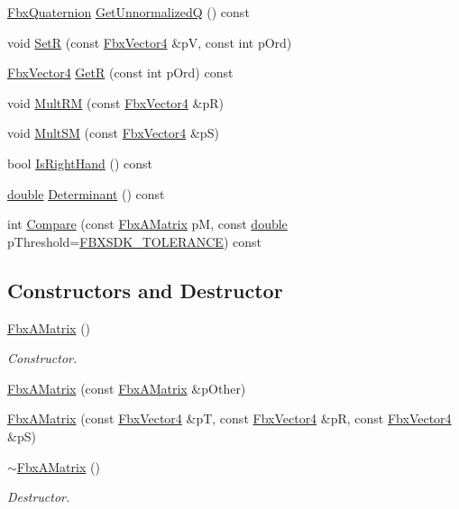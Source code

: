 \begin{DoxyCompactItemize}
\item 
\hyperlink{class_fbx_quaternion}{Fbx\+Quaternion} \hyperlink{class_fbx_a_matrix_aa6c9cff20dd3d26d5df852705a0ee149}{Get\+UnnormalizedQ} () const
\item 
void \hyperlink{class_fbx_a_matrix_a54374d0885fa0cf9ab2e619871cb000d}{SetR} (const \hyperlink{class_fbx_vector4}{Fbx\+Vector4} \&pV, const int p\+Ord)
\item 
\hyperlink{class_fbx_vector4}{Fbx\+Vector4} \hyperlink{class_fbx_a_matrix_ae36e44525e67b5a7076b9e2be733f456}{GetR} (const int p\+Ord) const
\item 
void \hyperlink{class_fbx_a_matrix_a74b163f39e346d5dedfd4d56f9624353}{Mult\+RM} (const \hyperlink{class_fbx_vector4}{Fbx\+Vector4} \&pR)
\item 
void \hyperlink{class_fbx_a_matrix_a96ecf0c5a8772ebdcc7f13b54651b3ed}{Mult\+SM} (const \hyperlink{class_fbx_vector4}{Fbx\+Vector4} \&pS)
\item 
bool \hyperlink{class_fbx_a_matrix_a9cdf7165572983d917a8e59577c3a55a}{Is\+Right\+Hand} () const
\item 
\hyperlink{class_fbx_a_matrix_ad463edbb9fea344643297701f159faa7}{double} \hyperlink{class_fbx_a_matrix_a4aa7cbe3d389f1d2cbdfbbf2de032192}{Determinant} () const
\item 
int \hyperlink{class_fbx_a_matrix_a9ffb29a163216aa93b36c29e143f08f8}{Compare} (const \hyperlink{class_fbx_a_matrix}{Fbx\+A\+Matrix} pM, const \hyperlink{class_fbx_a_matrix_ad463edbb9fea344643297701f159faa7}{double} p\+Threshold=\hyperlink{fbxtypes_8h_acf3cd6f208edb42ad9c9abbc1f7feea0}{F\+B\+X\+S\+D\+K\+\_\+\+T\+O\+L\+E\+R\+A\+N\+CE}) const
\end{DoxyCompactItemize}
\subsection*{Constructors and Destructor}
\begin{DoxyCompactItemize}
\item 
\hyperlink{class_fbx_a_matrix_afde94bf7fa3e5a001cf8c0733aab69ea}{Fbx\+A\+Matrix} ()
\begin{DoxyCompactList}\small\item\em Constructor. \end{DoxyCompactList}\item 
\hyperlink{class_fbx_a_matrix_a610a8cdf2f914285630decbf576d77ab}{Fbx\+A\+Matrix} (const \hyperlink{class_fbx_a_matrix}{Fbx\+A\+Matrix} \&p\+Other)
\item 
\hyperlink{class_fbx_a_matrix_a0771e5745b856c562c6415d83e331d15}{Fbx\+A\+Matrix} (const \hyperlink{class_fbx_vector4}{Fbx\+Vector4} \&pT, const \hyperlink{class_fbx_vector4}{Fbx\+Vector4} \&pR, const \hyperlink{class_fbx_vector4}{Fbx\+Vector4} \&pS)
\item 
\hyperlink{class_fbx_a_matrix_a9962c1e649b3e203ade001feecb5f922}{$\sim$\+Fbx\+A\+Matrix} ()
\begin{DoxyCompactList}\small\item\em Destructor. \end{DoxyCompactList}\end{DoxyCompactItemize}
